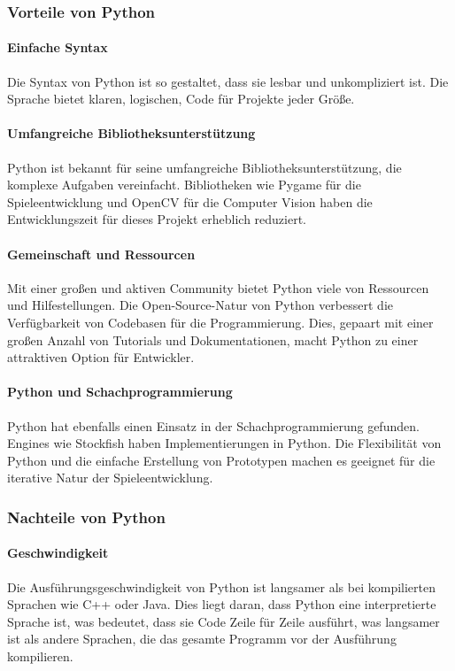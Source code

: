 \subsubsection{Vorteile von Python}
\paragraph{Einfache Syntax}
Die Syntax von Python ist so gestaltet, dass sie lesbar und unkompliziert ist. 
Die Sprache bietet klaren, logischen, Code für Projekte jeder Größe.

\paragraph{Umfangreiche Bibliotheksunterstützung}
Python ist bekannt für seine umfangreiche Bibliotheksunterstützung, die komplexe Aufgaben vereinfacht. 
Bibliotheken wie Pygame für die Spieleentwicklung und OpenCV für die Computer Vision haben die Entwicklungszeit für dieses Projekt erheblich reduziert.

\paragraph{Gemeinschaft und Ressourcen}
Mit einer großen und aktiven Community bietet Python viele von Ressourcen und Hilfestellungen. 
Die Open-Source-Natur von Python verbessert die Verfügbarkeit von Codebasen für die Programmierung. 
Dies, gepaart mit einer großen Anzahl von Tutorials und Dokumentationen, macht Python zu einer attraktiven Option für Entwickler.

\paragraph{Python und Schachprogrammierung}
Python hat ebenfalls einen Einsatz in der Schachprogrammierung gefunden. 
Engines wie Stockfish haben Implementierungen in Python. Die Flexibilität von Python und die einfache Erstellung von Prototypen 
machen es geeignet für die iterative Natur der Spieleentwicklung.

\subsubsection{Nachteile von Python}
\paragraph{Geschwindigkeit}
Die Ausführungsgeschwindigkeit von Python ist langsamer als bei kompilierten Sprachen wie C++ oder Java. 
Dies liegt daran, dass Python eine interpretierte Sprache ist, was bedeutet, dass sie Code Zeile für Zeile ausführt, 
was langsamer ist als andere Sprachen, die das gesamte Programm vor der Ausführung kompilieren.

